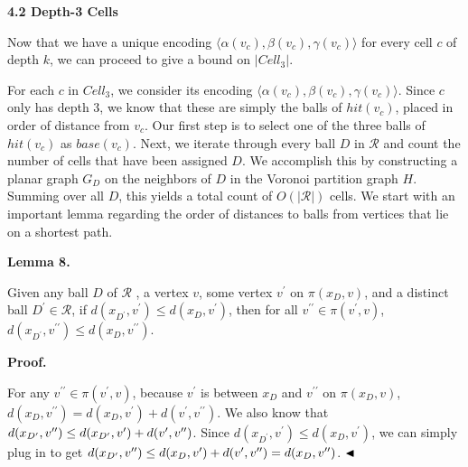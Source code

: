 \par
\par
\par\medskip\noindent\textbf{4.2 Depth-3 Cells}\par
Now that we have a unique encoding $\langle\alpha(v_{c}),\beta(v_{c}),\gamma(v_{c})\rangle$ for every cell $c$ of depth $k$, we can proceed to give a bound on $|\mathit{Cell}_{3}|$.
\par
\par
For each $c$ in $\mathit{Cell}_{3}$, we consider its encoding $\langle\alpha(v_{c}),\beta(v_{c}),\gamma(v_{c})\rangle$. Since $c$ only has depth 3, we know that these are simply the balls of $\mathit{hit}(v_{c})$, placed in order of distance from $v_{c}$. Our first step is to select one of the three balls of $\mathit{hit}(v_{c})$ as $\mathit{base}(v_{c})$. Next, we iterate through every ball $D$ in $\mathcal{R}$ and count the number of cells that have been assigned $D$. We accomplish this by constructing a planar graph $G_{D}$ on the neighbors of $D$ in the Voronoi partition graph $H$. Summing over all $D$, this yields a total count of $O(|\mathcal{R}|)$ cells. We start with an important lemma regarding the order of distances to balls from vertices that lie on a shortest path.
\par
\par
\par\medskip\noindent\textbf{Lemma 8.}\par
Given any ball $D$ of $\mathcal{R}$ , a vertex $v$, some vertex $v^{\prime}$ on $\pi(x_{D},v)$, and a distinct ball $D^{\prime}\in\mathcal{R}$, if $d(x_{D^{\prime}},v^{\prime})\leq d(x_{D},v^{\prime})$, then for all $v^{\prime\prime}\in\pi(v^{\prime},v)$, $d(x_{D^{\prime}},v^{\prime\prime})\leq d(x_{D},v^{\prime\prime})$.
\par
\par
\par
\par\medskip\noindent\textbf{Proof.}\par
For any $v^{\prime\prime}\in\pi(v^{\prime},v)$, because $v^{\prime}$ is between $x_{D}$ and $v^{\prime\prime}$ on $\pi(x_{D},v)$, $d(x_{D},v^{\prime\prime})=d(x_{D},v^{\prime})+d(v^{\prime},v^{\prime\prime})$. We also know that $d(x_{D^{\prime}},v^{\prime\prime})\leq d(x_{D^{\prime}},v^{\prime})+d(v^{%
\prime},v^{\prime\prime})$. Since $d(x_{D^{\prime}},v^{\prime})\leq d(x_{D},v^{\prime})$, we can simply plug in to get $d(x_{D^{\prime}},v^{\prime\prime})\leq d(x_{D},v^{\prime})+d(v^{\prime},v^{%
\prime\prime})=d(x_{D},v^{\prime\prime})$. $\hfill\blacktriangleleft$
